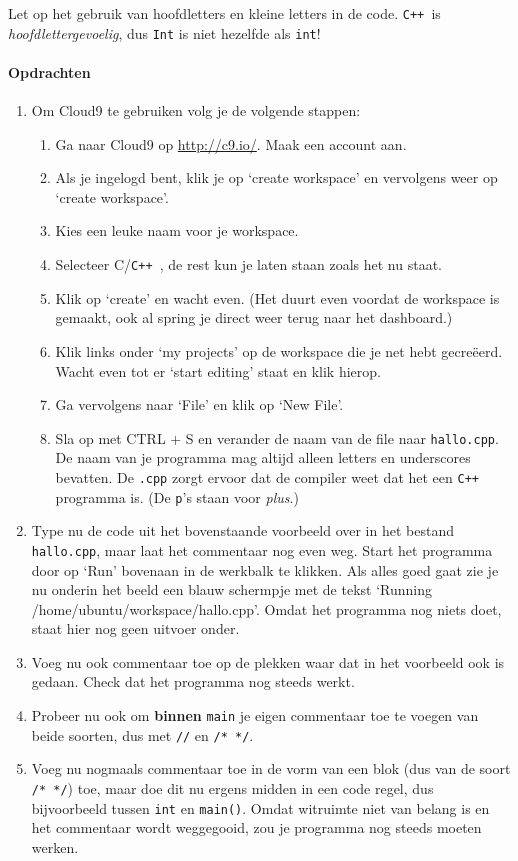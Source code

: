 \documentclass[12pt,a4paper]{article}
\newcommand{\icode}{\lstinline}
\newcommand{\mono}{\texttt}
\newcommand{\cpp}{\mono{C++ }}
\begin{document}
Let op het gebruik van hoofdletters en kleine letters in de code. \cpp is \emph{hoofdlettergevoelig}, dus \icode{Int} is niet hezelfde als \icode{int}!


\paragraph{Opdrachten}

\begin{enumerate}
	\item 
		Om Cloud9 te gebruiken volg je de volgende stappen: 
		\begin{enumerate} 
			\item Ga naar Cloud9 op \url{http://c9.io/}. Maak een account aan. 
			\item Als je ingelogd bent, klik je op `create workspace' en vervolgens weer op `create workspace'. 
			\item Kies een leuke naam voor je workspace. 
			\item Selecteer C/\cpp, de rest kun je laten staan zoals het nu staat. 
			\item Klik op `create' en wacht even. (Het duurt even voordat de workspace is gemaakt, ook al spring je direct weer terug naar het dashboard.) 
			\item Klik links onder `my projects' op de workspace die je net hebt gecreëerd. Wacht even tot er `start editing' staat en klik hierop. 
			\item Ga vervolgens naar `File' en klik op `New File'. 
			\item Sla op met CTRL + S en verander de naam van de file naar \mono{hallo.cpp}. De naam van je programma mag altijd alleen letters en underscores bevatten. De \mono{.cpp} zorgt ervoor dat de compiler weet dat het een \cpp programma is. (De \mono{p}'s staan voor \emph{plus}.)
		\end{enumerate} 

		
	\item 
		Type nu de code uit het bovenstaande voorbeeld over in het bestand \mono{hallo.cpp}, maar laat het commentaar nog even weg. Start het programma door op `Run' bovenaan in de werkbalk te klikken. Als alles goed gaat zie je nu onderin het beeld een blauw schermpje met de tekst `Running /home/ubuntu/workspace/hallo.cpp'. Omdat het programma nog niets doet, staat hier nog geen uitvoer onder.
	\item
		Voeg nu ook commentaar toe op de plekken waar dat in het voorbeeld ook is gedaan. Check dat het programma nog steeds werkt.
	\item
		Probeer nu ook om \textbf{binnen} \icode{main} je eigen commentaar toe te voegen van beide soorten, dus met \icode{//} en \icode{/* */}.
	\item 
		Voeg nu nogmaals commentaar toe in de vorm van een blok (dus van de soort \icode{/* */}) toe, maar doe dit nu ergens midden in een code regel, dus bijvoorbeeld tussen \icode{int} en \icode{main()}. Omdat witruimte niet van belang is en het commentaar wordt weggegooid, zou je programma nog steeds moeten werken.
\end{enumerate}
\end{document}
